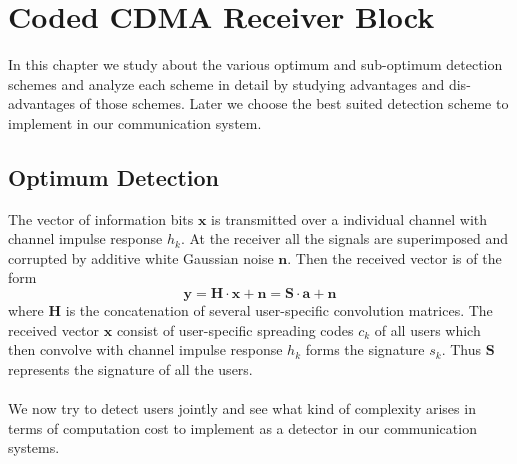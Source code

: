 \chapter{Coded CDMA Receiver Block}
In this chapter we study about the various optimum and sub-optimum detection schemes and analyze each scheme in detail by studying advantages and dis-advantages of those schemes. Later we choose the best suited detection scheme to implement in our communication system.
\section{Optimum Detection}
The vector of information bits $\mathrm{\mathbf{x}}$ is transmitted over a individual channel with channel impulse response $h_k$. At the receiver all the signals are superimposed and corrupted by additive white Gaussian noise $\mathrm{\mathbf{n}}$. Then the received vector is of the form
\begin{equation}
\mathrm{\mathbf{y}}=\mathrm{\mathbf{H}}\cdot\mathrm{\mathbf{x}}+\mathrm{\mathbf{n}}=\mathrm{\mathbf{S}}\cdot\mathrm{\mathbf{a}}+\mathrm{\mathbf{n}}
\end{equation}
where $\mathrm{\mathbf{H}}$ is the concatenation of several user-specific convolution matrices. The received vector $\mathrm{\mathbf{x}}$ consist of user-specific spreading codes $c_k$ of all users which then convolve with channel impulse response $h_k$ forms the signature $s_k$. Thus $\mathrm{\mathbf{S}}$ represents the signature of all the users.\\ \\
We now try to detect users jointly and see what kind of complexity arises in terms of computation cost to implement as a detector in our communication systems.
